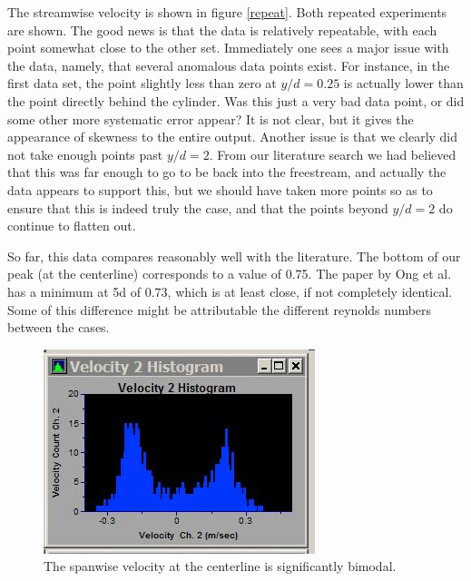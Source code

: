 \documentclass{article}
\begin{document}
The streamwise velocity is shown in figure \ref{repeat}. Both repeated
experiments are shown. The good news is that the data is relatively
repeatable, with each point somewhat close to the other set. 
Immediately one sees a major issue with the data,
namely, that several anomalous data points exist. For instance, in the
first data set, the point slightly less than zero at $y/d=0.25$ is
actually lower than the point directly behind the cylinder. Was this
just a very bad data point, or did some other more systematic error
appear? It is not clear, but it gives the appearance of skewness to the
entire output. Another issue is that we clearly did not take enough
points past $y/d=2$. From our literature search we had believed that
this was far enough to go to be back into the freestream, and actually
the data appears to support this, but we should have taken more points
so as to ensure that this is indeed truly the case, and that the points
beyond $y/d=2$ do continue to flatten out.

So far, this data compares reasonably well with the literature. The
bottom of our peak (at the centerline) corresponds to a value of
0.75. The paper by Ong et al. has a minimum at 5d of 0.73, which is at
least close, if not completely identical. Some of this difference might
be attributable the different reynolds numbers between the cases. 

\begin{figure}[!htb]
 \begin{center}
  \includegraphics[width = 12 cm]{figs/backflow}
  \caption{The spanwise velocity at the centerline is
  significantly bimodal. }
  \label{back}
 \end{center}
\end{figure}
\end{document}
